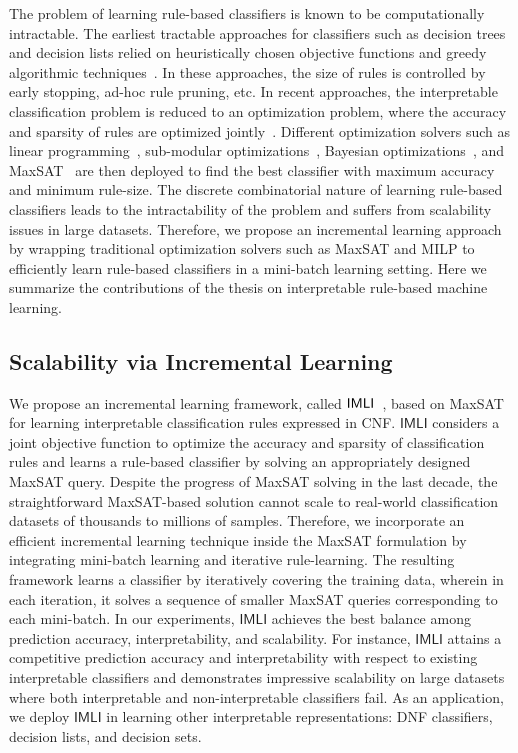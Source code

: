 The problem of learning rule-based classifiers is known to be computationally intractable. The earliest tractable approaches for classifiers such as decision trees and decision lists relied on heuristically chosen objective functions and greedy algorithmic techniques~\cite{ClarkN1989,CohenS1999,quinlan2014}. In these approaches, the size of rules is controlled by early stopping,  ad-hoc rule pruning, etc. In recent approaches, the interpretable classification problem is reduced to an optimization problem, where the accuracy and sparsity of rules are optimized jointly~\cite{lakkaraju2016interpretable,narodytska2018learning}. Different optimization solvers such as linear programming~\cite{malioutov2013exact}, sub-modular optimizations~\cite{lakkaraju2016interpretable}, Bayesian optimizations~\cite{letham2015interpretable}, and MaxSAT~\cite{malioutov2018mlic} are then deployed to find the best classifier with maximum accuracy and minimum rule-size. The discrete combinatorial nature of learning rule-based classifiers leads to the intractability of the problem and suffers from scalability issues in large datasets. Therefore, we propose an incremental learning approach by wrapping traditional optimization solvers such as MaxSAT and MILP to efficiently learn rule-based classifiers in a mini-batch learning setting.  Here we summarize the contributions of the thesis on interpretable rule-based machine learning.

\subsection*{Scalability via Incremental Learning}
We propose an incremental learning framework, called $ \mathsf{IMLI} $~\cite{GMM2022,GM2019},  based on MaxSAT for learning interpretable classification rules expressed in CNF. $ \mathsf{IMLI} $ considers a joint objective function to optimize the accuracy and sparsity of classification rules and learns a rule-based classifier by solving an appropriately designed MaxSAT query. Despite the progress of MaxSAT solving in the last decade, the straightforward MaxSAT-based solution cannot scale to real-world classification datasets of thousands to millions of samples. Therefore, we incorporate an efficient incremental learning technique inside the MaxSAT formulation by integrating mini-batch learning and iterative rule-learning. The resulting framework learns a classifier by iteratively covering the training data, wherein in each iteration, it solves a sequence of smaller MaxSAT queries corresponding to each mini-batch. In our experiments, $ \mathsf{IMLI} $ achieves the best balance among prediction accuracy, interpretability, and scalability. For instance, $ \mathsf{IMLI} $ attains a competitive prediction accuracy and interpretability with respect to existing interpretable classifiers and demonstrates impressive scalability on large datasets where both interpretable and non-interpretable classifiers fail. As an application, we deploy $ \mathsf{IMLI} $ in learning other interpretable representations: DNF classifiers, decision lists, and decision sets.
	
